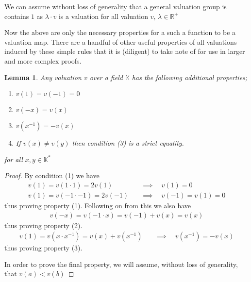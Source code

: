 \documentclass[12pt,a4paper]{amsart}
\newcommand{\R}{\mathbb{R}}
\newcommand{\K}{\mathbb{K}}
\newtheorem{lem}[thm]{Lemma}
\theoremstyle{definition}
\theoremstyle{remark}
\begin{document}
\note
We can assume without loss of generality that a general valuation group is contains $1$ as $\lambda\cdot v$ is a valuation for all valuation $v$, $\lambda\in\R^+$

Now the above are only the necessary properties for a such a function to be a valuation map. There are a handful of other useful properties of all valuations induced by these simple rules that it is (diligent) to take note of for use in larger and more complex proofs.

\begin{lem}
Any valuation $v$ over a field $\K$ has the following additional properties;
\begin{enumerate}
    \item $v(1) = v(-1) = 0$
    \item $v(-x) = v(x)$
    \item $v(x^{-1}) = -v(x)$
    \item If $v(x) \neq v(y)$ then condition (3) is a strict equality.
\end{enumerate} for all $x,y\in \K^*$
\end{lem}
\begin{proof}
By condition (1) we have
\begin{align*}
    v(1) = v(1\cdot1) = 2v(1)\quad&\implies\quad v(1) = 0\\
    v(1) = v(-1\cdot-1) = 2v(-1)\quad&\implies\quad v(-1) = v(1) = 0
\end{align*}
thus proving property (1).
Following on from this we also have
\begin{align*}
    v(-x) = v(-1\cdot x) = v(-1) + v(x) = v(x)
\end{align*}
thus proving property (2).
\begin{align*}
    v(1) = v(x\cdot x^{-1}) = v(x) + v(x^{-1})\quad&\implies\quad v(x^{-1}) = -v(x)
\end{align*}
thus proving property (3).

In order to prove the final property, we will assume, without loss of generality, that $v(a)<v(b)$

\end{proof}
\end{document}

